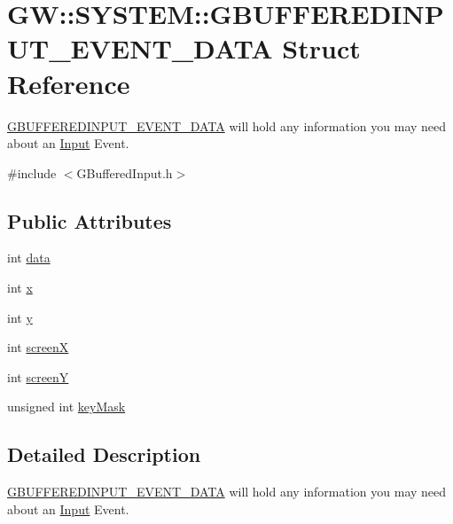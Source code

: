 \hypertarget{structGW_1_1SYSTEM_1_1GBUFFEREDINPUT__EVENT__DATA}{}\section{GW\+:\+:S\+Y\+S\+T\+EM\+:\+:G\+B\+U\+F\+F\+E\+R\+E\+D\+I\+N\+P\+U\+T\+\_\+\+E\+V\+E\+N\+T\+\_\+\+D\+A\+TA Struct Reference}
\label{structGW_1_1SYSTEM_1_1GBUFFEREDINPUT__EVENT__DATA}


\hyperlink{structGW_1_1SYSTEM_1_1GBUFFEREDINPUT__EVENT__DATA}{G\+B\+U\+F\+F\+E\+R\+E\+D\+I\+N\+P\+U\+T\+\_\+\+E\+V\+E\+N\+T\+\_\+\+D\+A\+TA} will hold any information you may need about an \hyperlink{classInput}{Input} Event.  




{\ttfamily \#include $<$G\+Buffered\+Input.\+h$>$}

\subsection*{Public Attributes}
\begin{DoxyCompactItemize}
\item 
int \hyperlink{structGW_1_1SYSTEM_1_1GBUFFEREDINPUT__EVENT__DATA_abe62d14dd92dc136e8ab4f53ee26d794}{data}
\item 
int \hyperlink{structGW_1_1SYSTEM_1_1GBUFFEREDINPUT__EVENT__DATA_a055e18b0d2aa3135ca8237bb06a0b4cb}{x}
\item 
int \hyperlink{structGW_1_1SYSTEM_1_1GBUFFEREDINPUT__EVENT__DATA_a68facd2e2754c908ecf8b8ef4ce34e08}{y}
\item 
int \hyperlink{structGW_1_1SYSTEM_1_1GBUFFEREDINPUT__EVENT__DATA_a8c87335f76992eddba30abe7312b5b43}{screenX}
\item 
int \hyperlink{structGW_1_1SYSTEM_1_1GBUFFEREDINPUT__EVENT__DATA_a066fa9b2dc654907d13590612238354d}{screenY}
\item 
unsigned int \hyperlink{structGW_1_1SYSTEM_1_1GBUFFEREDINPUT__EVENT__DATA_a7a818ba319e6693b89099938368a699e}{key\+Mask}
\end{DoxyCompactItemize}


\subsection{Detailed Description}
\hyperlink{structGW_1_1SYSTEM_1_1GBUFFEREDINPUT__EVENT__DATA}{G\+B\+U\+F\+F\+E\+R\+E\+D\+I\+N\+P\+U\+T\+\_\+\+E\+V\+E\+N\+T\+\_\+\+D\+A\+TA} will hold any information you may need about an \hyperlink{classInput}{Input} Event. 

